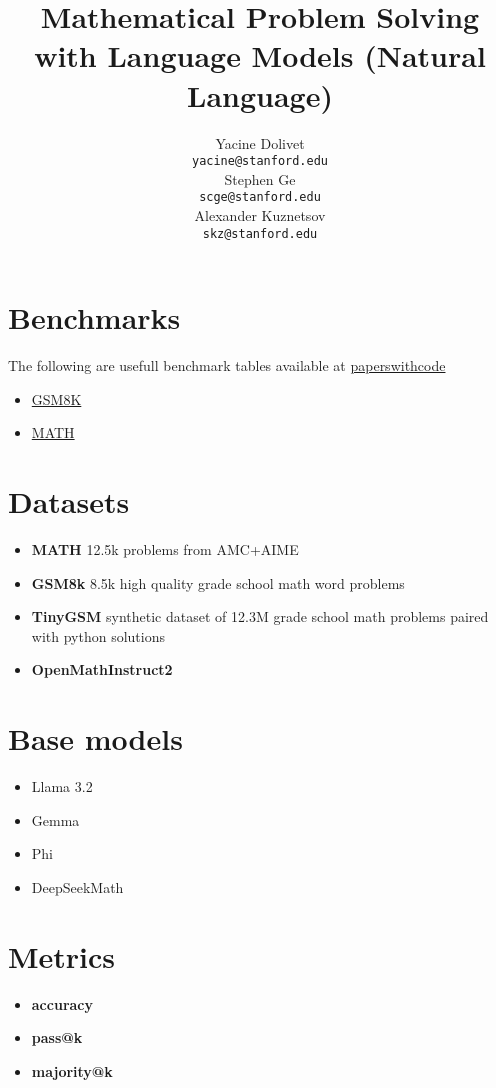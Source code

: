 \documentclass{article}
\title{Mathematical Problem Solving with Language Models (Natural Language)}
\author{
  Yacine Dolivet\\
  \texttt{yacine@stanford.edu} \\
  \And
  Stephen Ge\\
  \texttt{scge@stanford.edu} \\
   \And
  Alexander Kuznetsov\\
  \texttt{skz@stanford.edu} \\
}
\begin{document}


\maketitle

\section{Benchmarks}
The following are usefull benchmark tables available at \href{https://paperswithcode.com/}{paperswithcode}
\begin{itemize}
\item \href{https://paperswithcode.com/sota/arithmetic-reasoning-on-gsm8k}{GSM8K}
\item \href{https://paperswithcode.com/sota/math-word-problem-solving-on-math}{MATH}
\end{itemize}

\section{Datasets}
\begin{itemize}
\item \textbf{MATH} \cite{hendrycks} 12.5k problems from AMC+AIME 
\item \textbf{GSM8k} \cite{cobbe} 8.5k high quality grade school math word problems
\item \textbf{TinyGSM} \cite{liu} synthetic dataset of 12.3M grade school math problems paired with python solutions
\item \textbf{OpenMathInstruct2} \cite{omi2}
\end{itemize}

\section{Base models}
\begin{itemize}
\item Llama 3.2
\item Gemma
\item Phi
\item DeepSeekMath
\end{itemize}

\section{Metrics}
\begin{itemize}
\item \textbf{accuracy}
\item \textbf{pass@k}
\item \textbf{majority@k}
\end{itemize}
\end{document}
